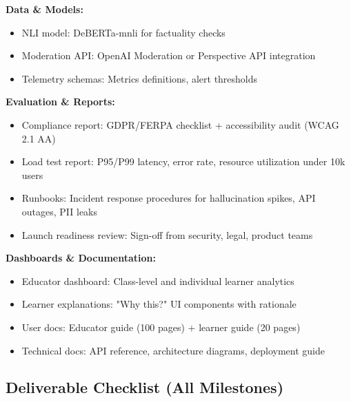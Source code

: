 \documentclass[11pt,letterpaper]{article}
\begin{document}
\textbf{Data \& Models:}
\begin{itemize}
\item NLI model: DeBERTa-mnli for factuality checks
\item Moderation API: OpenAI Moderation or Perspective API integration
\item Telemetry schemas: Metrics definitions, alert thresholds
\end{itemize}

\textbf{Evaluation \& Reports:}
\begin{itemize}
\item Compliance report: GDPR/FERPA checklist + accessibility audit (WCAG 2.1 AA)
\item Load test report: P95/P99 latency, error rate, resource utilization under 10k users
\item Runbooks: Incident response procedures for hallucination spikes, API outages, PII leaks
\item Launch readiness review: Sign-off from security, legal, product teams
\end{itemize}

\textbf{Dashboards \& Documentation:}
\begin{itemize}
\item Educator dashboard: Class-level and individual learner analytics
\item Learner explanations: "Why this?" UI components with rationale
\item User docs: Educator guide (100 pages) + learner guide (20 pages)
\item Technical docs: API reference, architecture diagrams, deployment guide
\end{itemize}

\subsection{Deliverable Checklist (All Milestones)}\label{subsec:deliverable-checklist}
\end{document}
